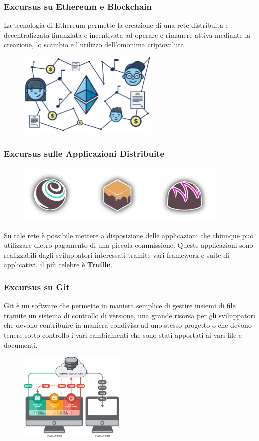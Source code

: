 \documentclass{beamer}
\begin{document}
\begin{frame}
	\frametitle{Excursus su Ethereum e Blockchain}
	La tecnologia di Ethereum permette la creazione di una rete distribuita e decentralizzata finanziata e incentivata ad operare e rimanere attiva mediante la creazione, lo scambio e l’utilizzo dell’omonima criptovaluta.
	\medskip
	\begin{figure}
		\includegraphics[width=0.60\textwidth]{figures/blockchain.png}
	\end{figure}
\end{frame}
\begin{frame}
	\frametitle{Excursus sulle Applicazioni Distribuite}
	\begin{figure}
		\includegraphics[width=0.90\textwidth]{figures/truffle.png}
	\end{figure}
	\bigskip
	Su tale rete è possibile mettere a disposizione delle applicazioni che chiunque può utilizzare dietro pagamento di una piccola commissione. Queste applicazioni sono realizzabili dagli sviluppatori interessati tramite vari framework e suite di applicativi, il più celebre è \textbf{Truffle}.
\end{frame}
\begin{frame}
	\frametitle{Excursus su Git}
	Git è un software che permette in maniera semplice di gestire insiemi di file tramite un sistema di controllo di versione, una grande risorsa per gli sviluppatori che devono contribuire in maniera condivisa ad uno stesso progetto o che devono tenere sotto controllo i vari cambiamenti che sono stati apportati ai vari file e documenti.
	\begin{figure}
		\includegraphics[width=0.45\textwidth]{figures/git2.png}
	\end{figure}
\end{frame}
\end{document}
